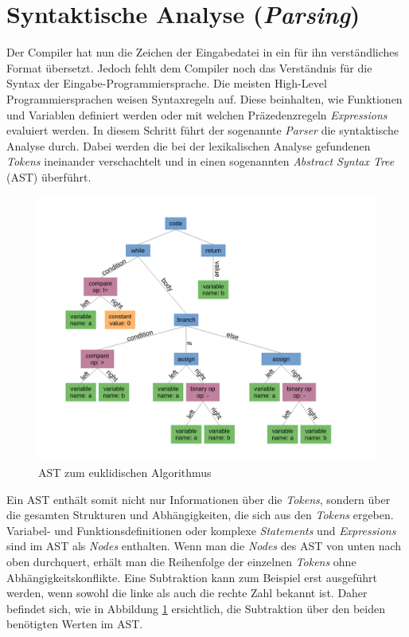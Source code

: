 \section{Syntaktische Analyse (\textit{Parsing})}
Der Compiler hat nun die Zeichen der Eingabedatei in ein für ihn verständliches Format übersetzt.
Jedoch fehlt dem Compiler noch das Verständnis für die Syntax der Eingabe-Programmiersprache.
Die meisten High-Level Programmiersprachen weisen Syntaxregeln auf. Diese beinhalten, wie Funktionen und Variablen definiert werden oder mit welchen Präzedenzregeln \textit{Expressions} evaluiert werden.
In diesem Schritt führt der sogenannte \textit{Parser} die syntaktische Analyse durch.
Dabei werden die bei der lexikalischen Analyse gefundenen \textit{Tokens} ineinander verschachtelt und in einen sogenannten \textit{Abstract Syntax Tree} (AST) überführt.

\begin{figure}[H]
    \centering
    \includegraphics[scale=0.4]{resources/images/AST.pdf}
    \caption[AST zum euklidischen Algorithmus. (https://en.wikipedia.org/wiki/Abstract\_syntax\_tree, besucht am 5.8.2024)]{AST zum euklidischen Algorithmus}
    \label{fig:syntax-tree}
\end{figure}

Ein AST enthält somit nicht nur Informationen über die \textit{Tokens}, sondern über die gesamten Strukturen und Abhängigkeiten, die sich aus den \textit{Tokens} ergeben.
Variabel- und Funktionsdefinitionen oder komplexe \textit{Statements} und \textit{Expressions} sind im AST als \textit{Nodes} enthalten.
Wenn man die \textit{Nodes} des AST von unten nach oben durchquert, erhält man die Reihenfolge der einzelnen \textit{Tokens} ohne Abhängigkeitskonflikte.
Eine Subtraktion kann zum Beispiel erst ausgeführt werden, wenn sowohl die linke als auch die rechte Zahl bekannt ist.
Daher befindet sich, wie in Abbildung \ref{fig:syntax-tree} ersichtlich, die Subtraktion über den beiden benötigten Werten im AST.

